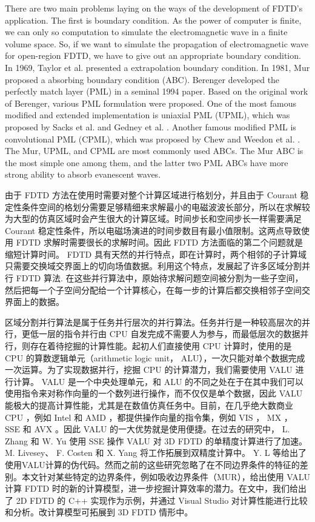 There are two main problems laying on the ways of the development of FDTD's application. The first is boundary condition. As the power of computer is finite, we can only so computation to simulate the electromagnetic wave in a finite volume space. So, if we want to simulate the propagation of electromagnetic wave for open-region FDTD, we have to give out an appropriate boundary condition. In 1969, Taylor\cite{taylor} et al. presented a extrapolation boundary condition. In 1981, Mur\cite{mur1981absorbing} proposed a absorbing boundary condition (ABC). Berenger \cite{mur1981absorbing} developed the perfectly match layer (PML) in a seminal 1994 paper. Based on the original work of Berenger, various PML formulation were proposed. One of the most famous modified and extended implementation is uniaxial PML (UPML), which was proposed by Sacks et al. \cite{sacks} and Gedney et al. \cite{gedney}. Another famous modified PML is convolutional PML (CPML), which was proposed by Chew and Weedon et al. \cite{gedney}. The Mur, UPML, and CPML are most commonly used ABCs. The Mur ABC is the most simple one among them, and the latter two PML ABCs have more strong ability to absorb evanescent waves.

由于 FDTD 方法在使用时需要对整个计算区域进行格划分，并且由于 Courant 稳定性条件空间的格划分需要足够精细来求解最小的电磁波波长部分，所以在求解较为大型的仿真区域时会产生很大的计算区域。时间步长和空间步长一样需要满足 Courant 稳定性条件，所以电磁场演进的时间步数目有最小值限制。这两点导致使用 FDTD 求解时需要很长的求解时间。因此 FDTD 方法面临的第二个问题就是缩短计算时间。 FDTD 具有天然的并行特点，即在计算时，两个相邻的子计算域只需要交换域交界面上的切向场值数据。利用这个特点，发展起了许多区域分割并行 FDTD 算法. 在这些并行算法中，原始待求解问题空间被分割为一些子空间，然后把每一个子空间分配给一个计算核心，在每一步的计算后都交换相邻子空间交界面上的数据。

区域分割并行算法是属于任务并行层次的并行算法。任务并行是一种较高层次的并行，更低一层的指令并行由 CPU 自发完成不需要人为参与，而最低层次的数据并行，则存在着待挖掘的计算性能。起初人们直接使用 CPU 计算时，使用的是 CPU 的算数逻辑单元（arithmetic logic unit， ALU），一次只能对单个数据完成一次运算。为了实现数据并行，挖掘 CPU 的计算潜力，我们需要使用 VALU 进行计算。 VALU 是一个中央处理单元，和 ALU 的不同之处在于在其中我们可以使用指令来对称作向量的一个数列进行操作，而不仅仅是单个数据，因此 VALU 能极大的提高计算性能，尤其是在数值仿真任务中。目前，在几乎绝大数商业 CPU ，例如 Intel 和 AMD ，都提供操作向量的指令集，例如 VIS ， MX ， SSE 和 AVX 。因此 VALU 的一大优势就是使用便捷。在过去的研究中， L. Zhang 和 W. Yu \cite{LZhangandWYu} 使用 SSE 操作 VALU 对 3D FDTD 的单精度计算进行了加速。 M. Livesey、 F. Costen 和 X. Yang \cite{Doubleprecision} 将工作拓展到双精度计算中。 Y. L \cite{AdvancedFDTDMethod} 等给出了使用VALU计算的伪代码。然而之前的这些研究忽略了在不同边界条件的特征的差别。本文针对某些特定的边界条件，例如吸收边界条件（MUR），给出使用 VALU 计算 FDTD 时的新的计算模型，进一步挖掘计算效率的潜力。在文中，我们给出了 2D FDTD 的 C++ 实现作为示例，并通过 Visual Studio 对计算性能进行比较和分析。改计算模型可拓展到 3D FDTD 情形中。

